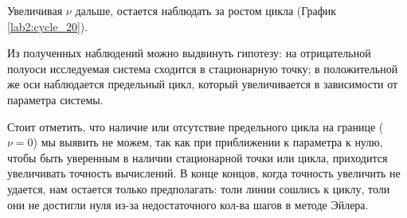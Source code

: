 Увеличивая $\nu$ дальше, остается наблюдать за ростом цикла (График \ref{lab2:cycle_20}).

Из полученных наблюдений можно выдвинуть гипотезу: на отрицательной полуоси исследуемая система
сходится в стационарную точку; в положительной же оси наблюдается предельный цикл, который увеличивается
в зависимости от параметра системы.

Стоит отметить, что наличие или отсутствие предельного цикла на границе ($\nu = 0$) мы выявить не можем,
так как при приближении к параметра к нулю, чтобы быть уверенным в наличии стационарной точки или цикла,
приходится увеличивать точность вычислений. В конце концов, когда точность увеличить не удается, нам остается
только предполагать: толи линии сошлись к циклу, толи они не достигли нуля из-за недостаточного кол-ва шагов
в методе Эйлера.
